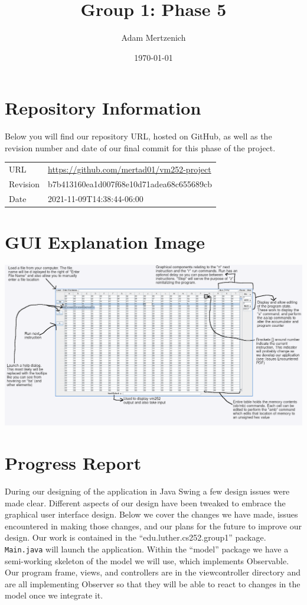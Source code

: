 \documentclass[11pt]{article}
\author{Adam Mertzenich}
\date{\today}
\title{Group 1: Phase 5}
\begin{document}
\maketitle
\tableofcontents


\section{Repository Information}
\label{sec:orgdf63753}

Below you will find our repository URL, hosted on GitHub, as well as the revision number and date of our final commit for this phase of the project.

\begin{center}
\begin{tabular}{ll}
URL & \url{https://github.com/mertad01/vm252-project}\\
Revision & b7b413160ea1d007f68e10d71adea68c655689cb\\
Date & 2021-11-09T14:38:44-06:00\\
\end{tabular}
\end{center}

\section{GUI Explanation Image}
\label{sec:orgda459b7}

\begin{center}
\includegraphics[width=.9\linewidth]{./annotated-screenshot.png}
\end{center}

\section{Progress Report}
\label{sec:org25acdc0}

During our designing of the application in Java Swing a few design issues were made clear. Different aspects of our design have been tweaked to embrace the graphical user interface design. Below we cover the changes we have made, issues encountered in making those changes, and our plans for the future to improve our design. Our work is contained in the ``edu.luther.cs252.group1'' package. \texttt{Main.java} will launch the application. Within the ``model'' package we have a semi-working skeleton of the model we will use, which implements Observable. Our program frame, views, and controllers are in the viewcontroller directory and are all implementing Observer so that they will be able to react to changes in the model once we integrate it.
\end{document}
